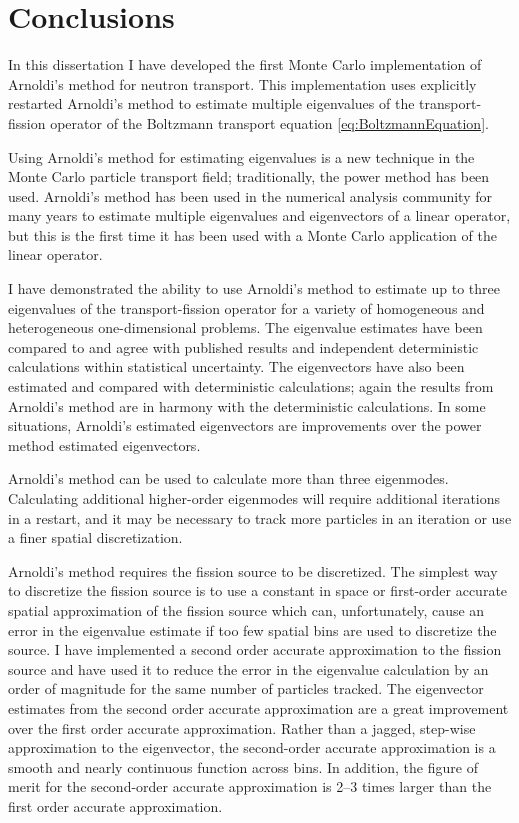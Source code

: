\chapter{Conclusions\label{ch:Conclusions}}
In this dissertation I have developed the first Monte Carlo implementation of Arnoldi's method for neutron transport.  This implementation uses explicitly restarted Arnoldi's method to estimate multiple eigenvalues of the transport-fission operator of the Boltzmann transport equation \eqref{eq:BoltzmannEquation}.  

Using Arnoldi's method for estimating eigenvalues is a new technique in the Monte Carlo particle transport field; traditionally, the power method has been used.  Arnoldi's method has been used in the numerical analysis community for many years to estimate multiple eigenvalues and eigenvectors of a linear operator, but this is the first time it has been used with a Monte Carlo application of the linear operator.

I have demonstrated the ability to use Arnoldi's method to estimate up to three eigenvalues of the transport-fission operator for a variety of homogeneous and heterogeneous one-dimensional problems.  The eigenvalue estimates have been compared to and agree with published results and independent deterministic calculations within statistical uncertainty.  The eigenvectors have also been estimated and compared with deterministic calculations; again the results from Arnoldi's method are in harmony with the deterministic calculations.  In some situations, Arnoldi's estimated eigenvectors are improvements over the power method estimated eigenvectors.

Arnoldi's method can be used to calculate more than three eigenmodes.  Calculating additional higher-order eigenmodes will require additional iterations in a restart, and it may be necessary to track more particles in an iteration or use a finer spatial discretization. 

Arnoldi's method requires the fission source to be discretized.  The simplest way to discretize the fission source is to use a constant in space or first-order accurate spatial approximation of the fission source which can, unfortunately, cause an error in the eigenvalue estimate if too few spatial bins are used to discretize the source.  I have implemented a second order accurate approximation to the fission source and have used it to reduce the error in the eigenvalue calculation by an order of magnitude for the same number of particles tracked.  The eigenvector estimates from the second order accurate approximation are a great improvement over the first order accurate approximation.  Rather than a jagged, step-wise approximation to the eigenvector, the second-order accurate approximation is a smooth and nearly continuous function across bins.  In addition, the figure of merit for the second-order accurate approximation is 2--3 times larger than the first order accurate approximation.

